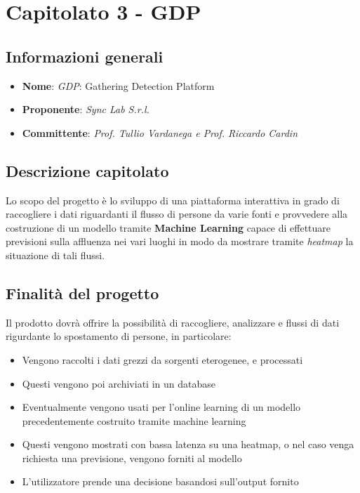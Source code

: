 \section{Capitolato 3 - GDP}
\subsection{Informazioni generali}
\begin{itemize}
    \item \textbf{Nome}: \emph{GDP}: Gathering Detection Platform
    \item \textbf{Proponente}: \emph{Sync Lab S.r.l.}
    \item \textbf{Committente}: \emph{Prof. Tullio Vardanega e Prof. Riccardo Cardin}
\end{itemize}
\subsection{Descrizione capitolato}
Lo scopo del progetto è lo sviluppo di una piattaforma interattiva in grado di raccogliere i dati riguardanti il flusso di persone da varie fonti e provvedere alla costruzione di un modello tramite \textbf{Machine Learning} capace di effettuare previsioni sulla affluenza nei vari luoghi in modo da mostrare tramite \emph{heatmap} la situazione di tali flussi.
\subsection{Finalità del progetto}
Il prodotto dovrà offrire la possibilità di raccogliere, analizzare e flussi di dati rigurdante lo spostamento di persone, in particolare:
\begin{itemize}
    \item Vengono raccolti i dati grezzi da sorgenti eterogenee, e processati
    \item Questi vengono poi archiviati in un database
    \item Eventualmente vengono usati per l'online learning di un modello precedentemente costruito tramite machine learning
    \item Questi vengono mostrati con bassa latenza su una heatmap, o nel caso venga richiesta una previsione, vengono forniti al modello
    \item L'utilizzatore prende una decisione basandosi sull'output fornito
\end{itemize}
